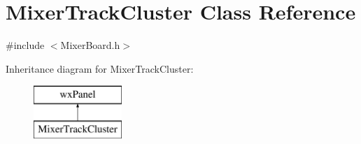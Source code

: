 \hypertarget{class_mixer_track_cluster}{}\section{Mixer\+Track\+Cluster Class Reference}
\label{class_mixer_track_cluster}


{\ttfamily \#include $<$Mixer\+Board.\+h$>$}

Inheritance diagram for Mixer\+Track\+Cluster\+:\begin{figure}[H]
\begin{center}
\leavevmode
\includegraphics[height=2.000000cm]{class_mixer_track_cluster}
\end{center}
\end{figure}
